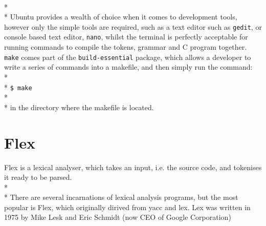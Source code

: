 \documentclass[12pt]{report}
\begin{document}
\\*
\\*
Ubuntu provides a wealth of choice when it comes to development tools, however only the simple tools are required, such as a text editor such as \texttt{gedit}, or console based text editor, \texttt{nano}, whilst the terminal is perfectly acceptable for running commands to compile the tokens, grammar and C program together.  \texttt{make} comes part of the \texttt{build-essential} package, which allows a developer to write a series of commands into a makefile, and then simply run the command:\\*\\*
\texttt{\$ make}
\\*
\\*
in the directory where the makefile is located.
\section{Flex}\label{sec:flex}
Flex is a lexical analyser, which takes an input, i.e. the source code, and tokenises it ready to be parsed.\\*
\\*
There are several incarnations of lexical analysis programs, but the most popular is Flex, which originally dirived from yacc and lex.  Lex was written in 1975 by Mike Lesk and Eric Schmidt (now CEO of Google Corporation)
\end{document}
